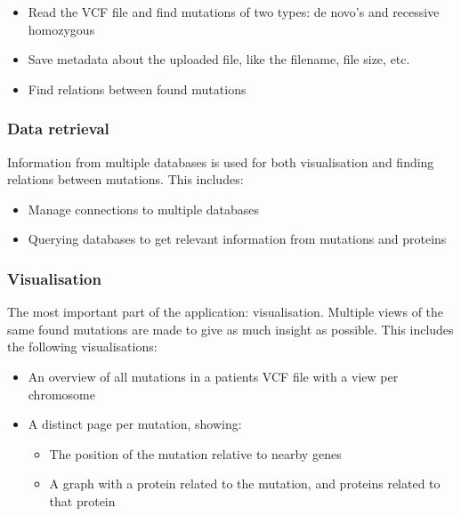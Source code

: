 \begin{itemize}
  \item Read the VCF file and find mutations of two types: de novo's and recessive homozygous
  \item Save metadata about the uploaded file, like the filename, file size, etc.
  \item Find relations between found mutations
\end{itemize}

\subsubsection{Data retrieval}

Information from multiple databases is used for both visualisation and finding relations between mutations. This includes:

\begin{itemize}
  \item Manage connections to multiple databases
  \item Querying databases to get relevant information from mutations and proteins
\end{itemize}

\subsubsection{Visualisation}

The most important part of the application: visualisation. Multiple views of the same found mutations are made to give as much insight as possible. This includes the following visualisations:

\begin{itemize}
  \item An overview of all mutations in a patients VCF file with a view per chromosome
  \item A distinct page per mutation, showing:
  \begin{itemize}
     \item The position of the mutation relative to nearby genes
     \item A graph with a protein related to the mutation, and proteins related to that protein
  \end{itemize}
\end{itemize}